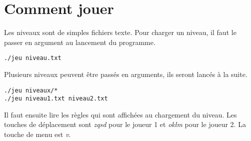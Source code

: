 \documentclass{article}
\begin{document}
\section{Comment jouer}

Les niveaux sont de simples fichiers texte. 
Pour charger un niveau, il faut le passer en argument au lancement du programme.
\begin{lstlisting}
./jeu niveau.txt
\end{lstlisting}
Plusieurs niveaux peuvent être passés en arguments, ils seront lancés à la suite.
\begin{lstlisting}
./jeu niveaux/*
./jeu niveau1.txt niveau2.txt
\end{lstlisting}
Il faut ensuite lire les règles qui sont affichées au chargement du niveau.
Les touches de déplacement sont \emph{zqsd} pour le joueur 1 et \emph{oklm} pour le joueur 2.
La touche de menu est \emph{v}.
\end{document}

